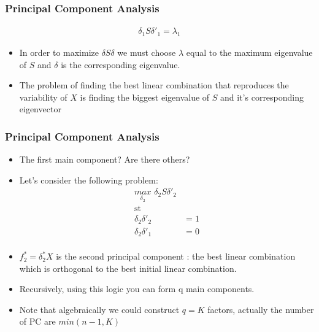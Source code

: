 \documentclass[
  shownotes,
  xcolor={svgnames},
  hyperref={colorlinks,citecolor=DarkBlue,linkcolor=DarkRed,urlcolor=DarkBlue}
  , aspectratio=169]{beamer}
\begin{document}
\begin{frame}
\frametitle{Principal Component Analysis}




\begin{align}
\delta_1 S \delta'_1 = \lambda_1 
\end{align}
\begin{itemize}
\item In order to maximize $\delta S \delta $ we must choose $\lambda$ equal to the maximum eigenvalue of $S$ and $\delta$ is the corresponding eigenvalue.
\medskip
\item The problem of finding the best linear combination that reproduces the variability of $X$ is finding the biggest eigenvalue of $S$ and it's corresponding eigenvector

\end{itemize}
\end{frame}

\begin{frame}
\frametitle{Principal Component Analysis}

\begin{itemize}

\item The first main component? Are there others?

\item Let's consider the following problem:
\begin{align}
\underset{\delta_2}{max}\,\, \delta_2 S \delta'_2 \\
\text{st}   \\
\delta_2 \delta'_2 &= 1   \\
\delta_2 \delta'_1 &=0 \\ \nonumber
\end{align}

\item $f_2^*=\delta^*_2X$ is the second principal component : the best linear combination which is
orthogonal to the best initial linear combination.
\item Recursively, using this logic you can form q  main components. 
\item Note that algebraically we could construct $q = K$ factors, actually the number of PC are $min(n-1,K)$ 
\end{itemize}

\end{frame}
\end{document}
